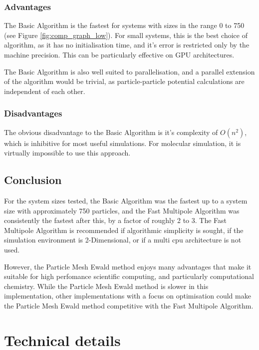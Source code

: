 \documentclass[pdftex,twoside,a4paper]{report}
\newcommand{\pmem}{Particle Mesh Ewald method}
\newcommand{\fma}{Fast Multipole Algorithm}
\begin{document}
\subsection{Advantages}
The Basic Algorithm is the fastest for systems with sizes in the range 0 to 750 (see Figure \ref{fig:comp_graph_low}). For small systems, this is the best choice of algorithm, as it has no initialisation time, and it's error is restricted only by the machine precision. This can be particularly effective on GPU architectures.

The Basic Algorithm is also well suited to parallelisation, and a parallel extension of the algorithm would be trivial, as particle-particle potential calculations are independent of each other.
\subsection{Disadvantages}
The obvious disadvantage to the Basic Algorithm is it's complexity of $O(n^2)$, which is inhibitive for most useful simulations. For molecular simulation, it is virtually impossible to use this approach.
\section{Conclusion}
For the system sizes tested, the Basic Algorithm was the fastest up to a system size with approximately 750 particles, and the \fma{} was consistently the fastest after this, by a factor of roughly 2 to 3. The \fma{} is recommended if algorithmic simplicity is sought, if the simulation environment is 2-Dimensional, or if a multi cpu architecture is not used.

However, the \pmem{} enjoys many advantages that make it suitable for high perfomance scientific computing, and particularly computational chemistry. While the \pmem{} is slower in this implementation, other implementations with a focus on optimisation could make the \pmem{} competitive with the \fma{}. 

\appendix
\chapter{Technical details}
\label{ap:implement}
\end{document}
